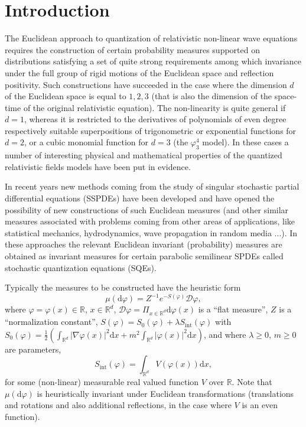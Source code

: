 \documentclass[a4paper,10pt]{article}
\newcommand{\mathd}{\mathrm{d}}
\newcommand{\tmop}[1]{\ensuremath{\operatorname{#1}}}
\newcommand{\textdots}[0]{...}
\begin{document}
{\tableofcontents}

\section{Introduction}

The Euclidean approach to quantization of relativistic non-linear wave
equations requires the construction of certain probability measures supported
on distributions satisfying a set of quite strong requirements among which
invariance under the full group of rigid motions of the Euclidean space and
reflection positivity. Such constructions have succeeded in the case where the
dimension $d$ of the Euclidean space is equal to $1, 2, 3$ (that is also the
dimension of the space-time of the original relativistic equation). The
non-linearity is quite general if $d = 1$, whereas it is restricted to the
derivatives of polynomials of even degree respectively suitable superpositions
of trigonometric or exponential functions for $d = 2$, or a cubic monomial
function for $d = 3$ (the $\varphi^4_3$ model). In these cases a number of
interesting physical and mathematical properties of the quantized relativistic
fields models have been put in evidence.

In recent years new methods coming from the study of singular stochastic
partial differential equations (SSPDEs) have been developed and have opened
the possibility of new constructions of such Euclidean measures (and other
similar measures associated with problems coming from other areas of
applications, like statistical mechanics, hydrodynamics, wave propagation in
random media {\textdots}). In these approaches the relevant Euclidean
invariant (probability) measures are obtained as invariant measures for
certain parabolic semilinear SPDEs called stochastic quantization equations
(SQEs).

Typically the measures to be constructed have the heuristic form
\[ \mu (\mathd \varphi) = Z^{- 1} e^{- S (\varphi)} \mathcal{D} \varphi, \]
where $\varphi = \varphi (x) \in \mathbb{R}$, $x \in \mathbb{R}^d$,
$\mathcal{D} \varphi = \Pi_{x \in \mathbb{R}^d} \mathd \varphi (x)$ is a
``flat measure'', $Z$ is a ``normalization constant'', $S (\varphi) = S_0
(\varphi) + \lambda S_{\tmop{int}} (\varphi)$ with $S_0 (\varphi) =
\frac{1}{2} \left( \int_{\mathbb{R}^d} | \nabla \varphi (x) |^2 \mathd x + m^2
\int_{\mathbb{R}^d} | \varphi (x) |^2 \mathd x \right)$, and where $\lambda
\geqslant 0$, $m \geqslant 0$ are parameters,
\[ S_{\tmop{int}} (\varphi) = \int_{\mathbb{R}^d} V (\varphi (x)) \mathd x, \]
for some (non-linear) measurable real valued function $V$ over $\mathbb{R}$.
Note that $\mu (\mathd \varphi)$ is heuristically invariant under Euclidean
transformations (translations and rotations and also additional reflections,
in the case where $V$ is an even function).
\end{document}
